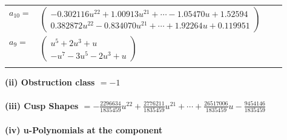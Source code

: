 \documentclass[1p]{elsarticle_modified}
\theoremstyle{definition}
\begin{document}
\begin{tabular}{m{7pt} m{180pt} m{7pt} m{180pt} }
\flushright $a_{10}=$&$\begin{pmatrix}-0.302116 u^{22}+1.00913 u^{21}+\cdots-1.05470 u+1.52594\\0.382872 u^{22}-0.834070 u^{21}+\cdots+1.92264 u+0.119951\end{pmatrix}$ \\
\flushright $a_{9}=$&$\begin{pmatrix}u^5+2 u^3+u\\- u^7-3 u^5-2 u^3+u\end{pmatrix}$\\&\end{tabular}
\flushleft \textbf{(ii) Obstruction class $= -1$}\\~\\
\flushleft \textbf{(iii) Cusp Shapes $= -\frac{2296634}{1835459} u^{22}+\frac{2776211}{1835459} u^{21}+\cdots+\frac{26517006}{1835459} u-\frac{9454146}{1835459}$}\\~\\
\newpage\renewcommand{\arraystretch}{1}
\flushleft \textbf{(iv) u-Polynomials at the component}\newline \\
\end{document}
